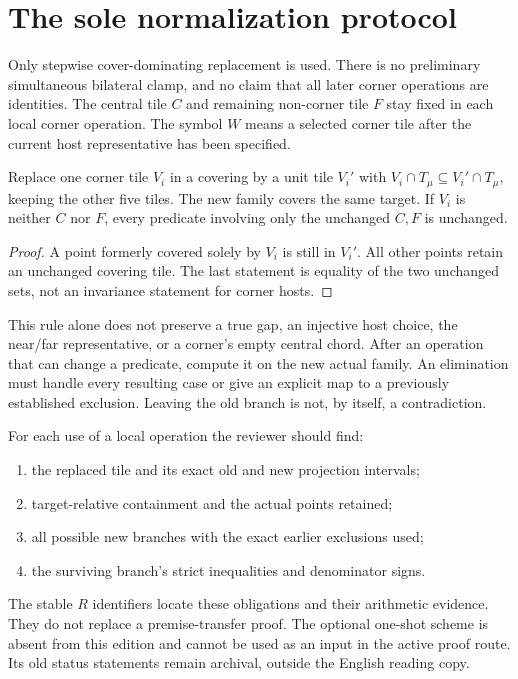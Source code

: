 \section{The sole normalization protocol}\label{app:M1}
Only stepwise cover-dominating replacement is used.
There is no preliminary simultaneous bilateral clamp, and no claim
that all later corner operations are identities.
The central tile $C$ and remaining non-corner tile $F$ stay fixed in
each local corner operation. The symbol $W$ means a selected corner
tile after the current host representative has been specified.

\begin{proposition}\label{prop:replacement-rule}
Replace one corner tile $V_i$ in a covering by a unit tile $V_i'$ with
$V_i\cap T_\mu\subseteq V_i'\cap T_\mu$, keeping the other five tiles.
The new family covers the same target. If $V_i$ is neither $C$ nor $F$,
every predicate involving only the unchanged $C,F$ is unchanged.
\end{proposition}
\begin{proof}
A point formerly covered solely by $V_i$ is still in $V_i'$.
All other points retain an unchanged covering tile.
The last statement is equality of the two unchanged sets, not an
invariance statement for corner hosts.
\end{proof}

This rule alone does not preserve a true gap, an injective host choice,
the near/far representative, or a corner's empty central chord.
After an operation that can change a predicate, compute it on the new
actual family. An elimination must handle every resulting case or
give an explicit map to a previously established exclusion.
Leaving the old branch is not, by itself, a contradiction.

For each use of a local operation the reviewer should find:
\begin{enumerate}
\item the replaced tile and its exact old and new projection intervals;
\item target-relative containment and the actual points retained;
\item all possible new branches with the exact earlier exclusions used;
\item the surviving branch's strict inequalities and denominator signs.
\end{enumerate}
The stable $R$ identifiers locate these obligations and their arithmetic
evidence. They do not replace a premise-transfer proof.
The optional one-shot scheme is absent from this edition and cannot be
used as an input in the active proof route. Its old status statements
remain archival, outside the English reading copy.

